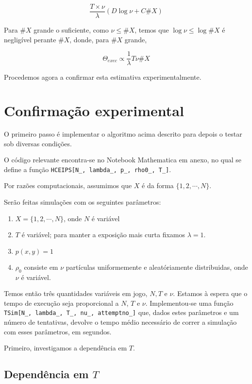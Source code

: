 \documentclass{article}
\begin{document}
	\[\frac{T \times \nu}\lambda (D \log \nu + C \#X)\]
	
	Para $\#X$ grande o suficiente, como $\nu \leq \#X$, temos que $\log \nu \leq \log \#X$ é negligível perante $\#X$, donde, para $\#X$ grande,
	
	\[\Theta_{exec} \propto \frac 1 \lambda T \nu \#\!X\]
	
	Procedemos agora a confirmar esta estimativa experimentalmente.
	
	\section{Confirmação experimental}
	
	O primeiro passo é implementar o algoritmo acima descrito para depois o testar sob diversas condições.
	
	O código relevante encontra-se no Notebook Mathematica em anexo, no qual se define a função \texttt{HCEIPS[N\_, lambda\_, p\_, rho0\_, T\_]}.
	
	Por razões computacionais, assumimos que $X$ é da forma $\{1, 2, \cdots, N\}$.
	
	Serão feitas simulações com os seguintes parâmetros:
	
	\begin{enumerate}
	\item $X = \{1, 2, \cdots, N\}$, onde $N$ é variável
	
	\item $T$ é variável; para manter a exposição mais curta fixamos $\lambda = 1$.
	
	\item $p(x,y) = 1$
	
	\item $\rho_0$ consiste em $\nu$ partículas uniformemente e aleatóriamente distribuidas, onde $\nu$ é variável.
	\end{enumerate}
	
	Temos então três quantidades variáveis em jogo, $N, T$ e $\nu$. Estamos à espera que o tempo de execução seja proporcional a $N$, $T$ e $\nu$. Implementou-se uma função \texttt{TSim[N\_, lambda\_, T\_, nu\_, attemptno\_]} que, dados estes parâmetros e um número de tentativas, devolve o tempo médio necessário de correr a simulação com esses parâmetros, em segundos.
	
	Primeiro, investigamos a dependência em $T$.
	
	\subsection{Dependência em $T$}
	
\end{document}
